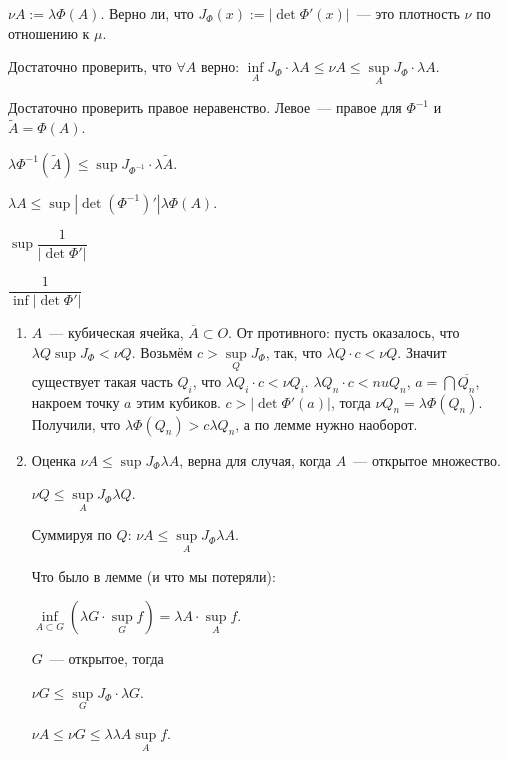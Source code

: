 \documentclass{article}
\begin{document}
            $\nu A := \lambda \Phi(A)$. Верно ли, что $J_{\Phi} (x) := \left| \det \Phi'(x) \right|$~--- это плотность $\nu$ по отношению к $\mu$.
            
            Достаточно проверить, что $\forall A$ верно: $\inf\limits_{A} J_{\Phi} \cdot \lambda A \leqslant \nu A \leqslant \sup\limits_{A} J_{\Phi} \cdot \lambda A$.
            
            Достаточно проверить правое неравенство. Левое~--- правое для $\Phi^{-1}$ и $\widetilde{A} = \Phi(A)$.
            
            $\lambda \Phi^{-1} \left( \widetilde{A} \right) \leqslant \sup J_{\Phi^{-1}} \cdot \lambda \widetilde{A}$.
            
            $\lambda A \leqslant \sup \left| \det (\Phi^{-1})' \right| \lambda \Phi(A)$.
            
            $\sup \dfrac{1}{\left| \det \Phi' \right|}$
            
            $\dfrac{1}{\inf \left| \det \Phi' \right|}$
            
            \begin{enumerate}
            
                \item $A$~--- кубическая ячейка, $\overline{A} \subset O$. От противного: пусть оказалось, что $\lambda Q \sup J_{\Phi} < \nu Q$. Возьмём $c > \sup\limits_{Q} J_{\Phi}$, так, что $\lambda Q \cdot c < \nu Q$. Значит существует такая часть $Q_i$, что $\lambda Q_i \cdot c < \nu Q_i$. $\lambda Q_n \cdot c < nu Q_n$, $a = \bigcap \overline{Q_n}$, накроем точку $a$ этим кубиков. $c > \left| \det \Phi'(a) \right|$, тогда $\nu Q_n = \lambda \Phi(Q_n)$. Получили, что $\lambda \Phi(Q_n) > c \lambda Q_n$, а по лемме нужно наоборот.
            
                \item Оценка $\nu A \leqslant \sup J_{\Phi} \lambda A$, верна для случая, когда $A$~--- открытое множество.
                
                    $\nu Q \leqslant \sup\limits_{A} J_{\Phi} \lambda Q$.
                    
                    Суммируя по $Q$: $\nu A \leqslant \sup\limits_{A} J_{\Phi} \lambda A$.
                    
                    Что было в лемме (и что мы потеряли):
                    
                    $\inf\limits_{A \subset G} \left( \lambda G \cdot \sup\limits_{G} f \right) = \lambda A \cdot \sup\limits_{A} f$.
                    
                    $G$~--- открытое, тогда
                    
                    $\nu G \leqslant \sup\limits_{G} J_{\Phi} \cdot \lambda G$.
                    
                    $\nu A \leqslant \nu G \leqslant \lambda \lambda A \sup\limits_{A} f$.
                    
            \end{enumerate}
\end{document}
